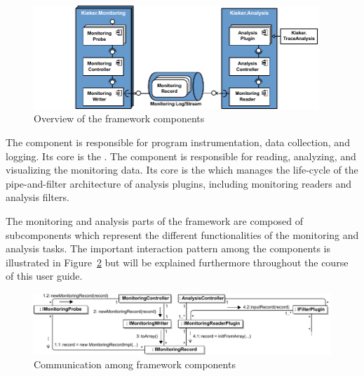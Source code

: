 \begin{figure}[H]\centering
\includegraphics[width=0.96\textwidth]{images/kiekerComponentDiagram-woCloud-bw-w-record-newNames-withTraceAnalysis-colors}
\caption{Overview of the framework components}
\label{fig:KiekerComponentDiagram}
\end{figure}

\noindent The \KiekerMonitoringPart{} component is responsible for program instrumentation, data collection, and logging. Its core is the . %
%
The component \KiekerAnalysisPart{} is responsible for reading, analyzing, and visualizing the monitoring data. Its core is the  which manages the life-cycle of the pipe-and-filter architecture of analysis plugins, including monitoring readers and  analysis filters.

The monitoring and analysis parts of the \Kieker{} framework are composed of subcomponents which represent the different functionalities of the monitoring and analysis tasks. The important interaction pattern among the components is illustrated in Figure~\ref{fig:KiekerCommunicationDiagram} but will be explained furthermore throughout the course of this user guide.

\vspace{1cm}

\begin{figure}[H]\centering
\includegraphics[width=1\textwidth]{images/kiekerCommunications-revisedReArranged-woMonitoringLog-bw-newNames}
\caption{Communication among \Kieker{} framework components}
\label{fig:KiekerCommunicationDiagram}
\end{figure}

